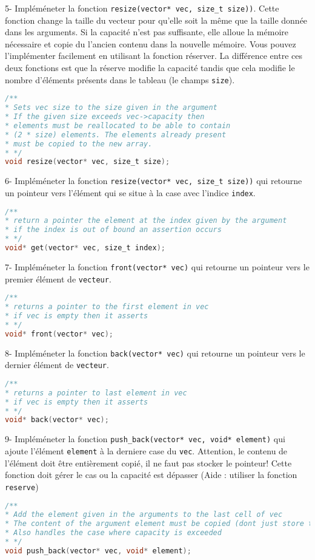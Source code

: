 \documentclass[a4paper]{article}
\begin{document}
	5- Impléméneter la fonction \texttt{resize(vector* vec, size\_t size))}. Cette fonction change la taille du vecteur pour qu'elle soit la même que la taille donnée dans les arguments. Si la capacité n'est pas suffisante, elle alloue la mémoire nécessaire et copie du l'ancien contenu dans la nouvelle mémoire. Vous pouvez l'implémenter facilement en utilisant la fonction réserver. La différence entre ces deux fonctions est que la réserve modifie la capacité tandis que cela modifie le nombre d'éléments présents dans le tableau (le champs \texttt{size}).
\begin{lstlisting}[language=C]
/**
* Sets vec size to the size given in the argument
* If the given size exceeds vec->capacity then
* elements must be reallocated to be able to contain
* (2 * size) elements. The elements already present
* must be copied to the new array.
* */
void resize(vector* vec, size_t size);
\end{lstlisting}

	6- Impléméneter la fonction \texttt{resize(vector* vec, size\_t size))} qui retourne un pointeur vers l'élément qui se situe à la case avec l'indice \texttt{index}. 
\begin{lstlisting}[language=C]
/**
* return a pointer the element at the index given by the argument
* if the index is out of bound an assertion occurs
* */
void* get(vector* vec, size_t index);
\end{lstlisting}
	7- Impléméneter la fonction \texttt{front(vector* vec)} qui retourne un pointeur vers le premier élément de \texttt{vecteur}. 
\begin{lstlisting}[language=C]
/**
* returns a pointer to the first element in vec
* if vec is empty then it asserts
* */
void* front(vector* vec);
\end{lstlisting}
	8- Impléméneter la fonction \texttt{back(vector* vec)} qui retourne un pointeur vers le dernier élément de \texttt{vecteur}. 
\begin{lstlisting}[language=C]
/**
* returns a pointer to last element in vec
* if vec is empty then it asserts
* */
void* back(vector* vec);
\end{lstlisting}

	9- Impléméneter la fonction \texttt{push\_back(vector* vec, void* element)} qui ajoute l'élément \texttt{element} à la derniere case du \texttt{vec}. Attention, le contenu de l'élément doit être entièrement copié, il ne faut pas stocker le pointeur! Cette fonction doit gérer le cas ou la capacité est dépasser (Aide : utiliser la fonction \texttt{reserve})
\begin{lstlisting}[language=C]
/**
* Add the element given in the arguments to the last cell of vec
* The content of the argument element must be copied (dont just store the pointer)
* Also handles the case where capacity is exceeded
* */
void push_back(vector* vec, void* element);
\end{lstlisting}
\end{document}
